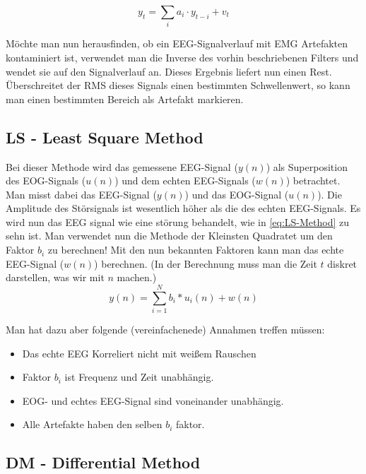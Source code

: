 \documentclass[preprint,12pt]{elsarticle}
\begin{document}
\begin{equation}
y_t = \sum_i a_i \cdot y_{t-i} + v_t
\end{equation}

Möchte man nun herausfinden, ob ein EEG-Signalverlauf mit EMG Artefakten kontaminiert ist, verwendet man die Inverse
des vorhin beschriebenen Filters und wendet sie auf den Signalverlauf an. Dieses Ergebnis liefert nun einen Rest.
Überschreitet der RMS dieses Signals einen bestimmten Schwellenwert, so kann man einen bestimmten Bereich als Artefakt markieren.
~\cite{Pfurtscheller2007}



\subsection{LS - Least Square Method}

Bei dieser Methode wird das gemessene EEG-Signal ($y(n)$) als Superposition des EOG-Signals ($u(n)$) und dem echten EEG-Signals
 ($w(n)$) betrachtet. Man misst dabei das EEG-Signal ($y(n)$) und das EOG-Signal ($u(n)$). Die Amplitude des Störsignals ist wesentlich höher als die des
 echten EEG-Signals. Es wird nun das EEG signal wie eine störung behandelt, wie in \ref{eq:LS-Method} zu sehn ist. Man verwendet nun die Methode der Kleinsten
 Quadratet um den Faktor $b_i$ zu berechnen! Mit den nun bekannten Faktoren kann man das echte EEG-Signal ($w(n)$) berechnen.
(In der Berechnung muss man die Zeit $t$ diskret darstellen, was wir mit $n$  machen.)~\cite{Thulasidas2004}
\begin{equation} \label{eq:LS-Method}
 y(n) =  \sum_{i=1}^{N} b_i * u_i(n) + w(n)
\end{equation}

Man hat dazu aber folgende (vereinfachenede) Annahmen treffen müssen:
\begin{itemize}
 \item Das echte EEG Korreliert nicht mit weißem Rauschen
 \item Faktor $b_i$ ist Frequenz und Zeit unabhängig.
 \item EOG- und echtes EEG-Signal sind voneinander unabhängig.
 \item Alle Artefakte haben den selben $b_i$ faktor.
\end{itemize}




\subsection{DM - Differential Method}
\end{document}

